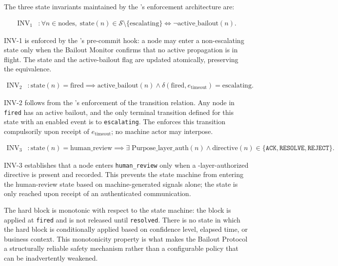 The three state invariants maintained by the \fact{}'s enforcement architecture are:

\begin{align}
\mathrm{INV}_1 &: \forall n \in \mathrm{nodes},\; \mathrm{state}(n) \in \mathcal{S} \setminus \{\mathrm{escalating}\} \iff \neg\mathrm{active\_bailout}(n). \tag{INV-1}
\end{align}

INV-1 is enforced by the \fact{}'s pre-commit hook: a node may enter a non-escalating state only when the Bailout Monitor confirms that no active propagation is in flight. The state and the active-bailout flag are updated atomically, preserving the equivalence.

\begin{align}
\mathrm{INV}_2 &: \mathrm{state}(n) = \mathrm{fired} \implies \mathrm{active\_bailout}(n) \land \delta(\mathrm{fired}, e_{\mathrm{timeout}}) = \mathrm{escalating}. \tag{INV-2}
\end{align}

INV-2 follows from the \fact{}'s enforcement of the transition relation. Any node in \texttt{fired} has an active bailout, and the only terminal transition defined for this state with an enabled event is to \texttt{escalating}. The \fact{} enforces this transition compulsorily upon receipt of $e_{\mathrm{timeout}}$; no machine actor may interpose.

\begin{align}
\mathrm{INV}_3 &: \mathrm{state}(n) = \mathrm{human\_review} \implies \exists\; \mathrm{Purpose\_layer\_auth}(n) \land \mathrm{directive}(n) \in \{\texttt{ACK}, \texttt{RESOLVE}, \texttt{REJECT}\}. \tag{INV-3}
\end{align}

INV-3 establishes that a node enters \texttt{human\_review} only when a \purpose{}-layer-authorized directive is present and recorded. This prevents the state machine from entering the human-review state based on machine-generated signals alone; the state is only reached upon receipt of an authenticated \purpose{} communication.

The hard block is monotonic with respect to the state machine: the block is applied at \texttt{fired} and is not released until \texttt{resolved}. There is no state in which the hard block is conditionally applied based on confidence level, elapsed time, or business context. This monotonicity property is what makes the Bailout Protocol a structurally reliable safety mechanism rather than a configurable policy that can be inadvertently weakened.

